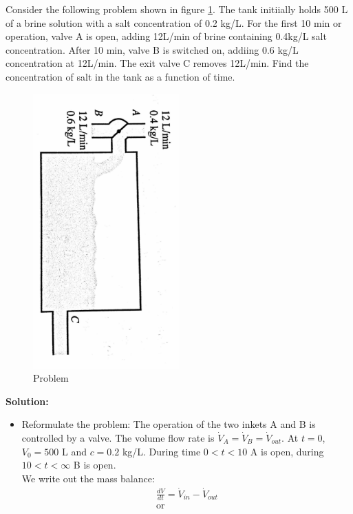 \begin{exmp}{}
Consider the following problem shown in figure \ref{fig:prob}. The tank initiially holds 500 L of a brine solution with a salt concentration of 0.2 kg/L. For the first 10 min or operation, valve A is open, adding 12L/min of brine containing 0.4kg/L salt concentration. After 10 min, valve B is switched on, addiing 0.6 kg/L concentration at 12L/min. The exit valve C removes 12L/min. Find the concentration of salt in the tank as a function of time.\\

\begin{figure}
\centering
\includegraphics[angle=90,width=0.5\textwidth]{./figs/sampleProb.pdf}
\caption{Problem \label{fig:prob}}
\end{figure}
\textbf{Solution:}\\
\begin{itemize}
\item Reformulate the problem:
 The operation of the two inkets A and B is controlled by a valve.  The volume flow rate is $\dot{V}_A=\dot{V}_B=\dot{V}_{out}$. At $t=0$, $V_0=500$ L and $c=0.2$ kg/L. During time $0<t<10$ A is open, during $10<t<\infty$ B is open. \\
 We write out the mass balance:
 \begin{align*}
 \frac{dV}{dt}=\dot{V}_{in}-\dot{V}_{out} \\
 \text{or}\\

\end{align*}
\end{itemize}
\end{exmp}
